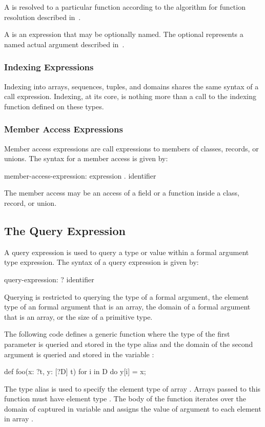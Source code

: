 A  is resolved to a particular function
according to the algorithm for function resolution described
in~.

A  is an expression that may be optionally
named.  The optional  represents a named actual
argument described in~.

\subsubsection{Indexing Expressions}
\label{Indexing_Expressions}

Indexing into arrays, sequences, tuples, and domains shares the same
syntax of a call expression.  Indexing, at its core, is nothing more
than a call to the indexing function defined on these types.

\subsubsection{Member Access Expressions}
\label{Member_Access_Expressions}

Member access expressions are call expressions to members of classes,
records, or unions.  The syntax for a member access is given by:
\begin{syntax}
member-access-expression:
  expression . identifier
\end{syntax}
The member access may be an access of a field or a function inside a
class, record, or union.

\subsection{The Query Expression}
\label{The_Query_Expression}

A query expression is used to query a type or value within a formal
argument type expression.  The syntax of a query expression is given
by:
\begin{syntax}
query-expression:
  ? identifier
\end{syntax}
Querying is restricted to querying the type of a formal argument, the
element type of an formal argument that is an array, the domain of
a formal argument that is an array, or the size of a primitive type.
\begin{example}
The following code defines a generic function where the type of the
first parameter is queried and stored in the type alias  and
the domain of the second argument is queried and stored in the
variable :
\begin{chapel}
def foo(x: ?t, y: [?D] t) {
  for i in D do
    y[i] = x;
}
\end{chapel}
The type alias  is used to specify the element type of
array .  Arrays passed to this function must have element
type .  The body of the function iterates over the domain
of  captured in variable  and assigns the value of
argument  to each element in array .
\end{example}

